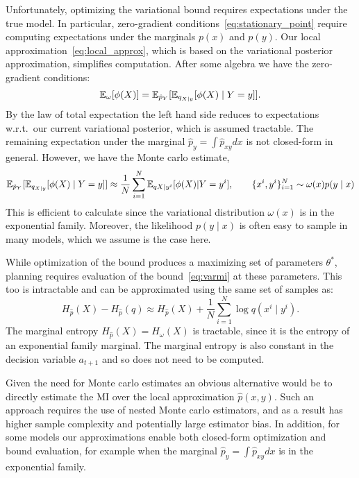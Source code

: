 \documentclass{article}
\begin{document}
Unfortunately, optimizing the variational bound requires expectations
under the true model.  In particular, zero-gradient
conditions~\eqref{eq:stationary_point} require computing expectations
under the marginals $p(x)$ and $p(y)$.  Our local
approximation~\eqref{eq:local_approx}, which is based on the
variational posterior approximation, simplifies computation.  After
some algebra we have the zero-gradient conditions:
\begin{equation}\label{eq:local_zero_grad}
  \operatorname{\mathbb{E}}_{\omega}[ \phi(X) ] = \operatorname{\mathbb{E}}_{\hat{p}_Y}[ \operatorname{\mathbb{E}}_{q_{X\mid y}}[ \phi(X)
      \mid Y=y ] ].
\end{equation}
By the law of total expectation the left hand side reduces to
expectations w.r.t.~our current variational posterior, which is
assumed tractable.  The remaining expectation under the marginal
$\hat{p}_y = \int \hat{p}_{xy} dx$ is not closed-form in general.
However, we have the Monte carlo estimate,
\[
  \operatorname{\mathbb{E}}_{\hat{p}_Y}[ \operatorname{\mathbb{E}}_{q_{X\mid y}}[ \phi(X) \mid Y=y ] ] \approx
    \frac{1}{N} \sum_{i=1}^N \operatorname{\mathbb{E}}_{q{X\mid y^i}}[ \phi(X) | Y = y^i],
    \qquad \{x^i,y^i\}_{i=1}^N \sim \omega(x)
    p(y\mid x)
\]
This is efficient to calculate since the variational distribution
$\omega(x)$ is in the exponential family.  Moreover, the likelihood
$p(y \mid x)$ is often easy to sample in many models, which we assume
is the case here.

While optimization of the bound produces a maximizing set of parameters
$\theta^{*}$, planning requires evaluation of the
bound~\eqref{eq:varmi} at these parameters.  This too is intractable
and can be approximated using the same set of samples as:
\begin{equation}
  H_{\hat{p}}(X) - H_{\hat{p}}(q) \approx H_{\hat{p}}(X) + \frac{1}{N} \sum_{i=1}^N \log q(x^i \mid y^i).
\end{equation}
The marginal entropy $H_{\hat{p}}(X) = H_{\omega}(X)$ is tractable,
since it is the entropy of an exponential family marginal.  The
marginal entropy is also constant in the decision variable $a_{t+1}$
and so does not need to be computed.

Given the need for Monte carlo estimates an obvious alternative would
be to directly estimate the MI over the local approximation
$\hat{p}(x,y)$.  Such an approach requires the use of nested Monte
carlo estimators, and as a result has higher sample complexity and
potentially large estimator bias.  In addition, for some models our
approximations enable both closed-form optimization and bound
evaluation, for example when the marginal $\hat{p}_y = \int
\hat{p}_{xy} dx$ is in the exponential family.
\end{document}
